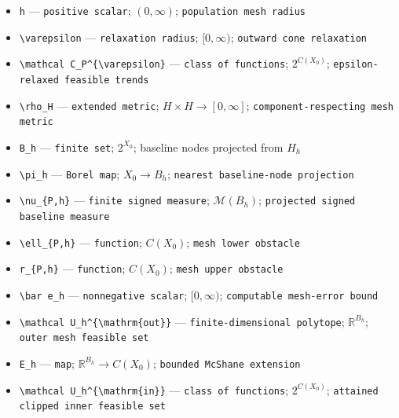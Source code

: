 \documentclass{article}
\begin{document}
\begin{itemize}
  \item \texttt{h} --- \texttt{positive scalar}; \((0,\infty)\); \texttt{population mesh radius}
  \item \texttt{\textbackslash{}\allowbreak{}varepsilon} --- \texttt{relaxation radius}; \([0,\infty)\); \texttt{outward cone relaxation}
  \item \texttt{\textbackslash{}\allowbreak{}mathcal C\_\allowbreak{}P\textasciicircum{}\{\textbackslash{}\allowbreak{}varepsilon\}\allowbreak{}} --- \texttt{class of functions}; \(2^{C(X_0)}\); \texttt{epsilon-\allowbreak{}relaxed feasible trends}
  \item \texttt{\textbackslash{}\allowbreak{}rho\_\allowbreak{}H} --- \texttt{extended metric}; \(H\times H\to[0,\infty]\); \texttt{component-\allowbreak{}respecting mesh metric}
  \item \texttt{B\_\allowbreak{}h} --- \texttt{finite set}; \(2^{X_0}\); baseline nodes projected from \(H_h\)
  \item \texttt{\textbackslash{}\allowbreak{}pi\_\allowbreak{}h} --- \texttt{Borel map}; \(X_0\to B_h\); \texttt{nearest baseline-\allowbreak{}node projection}
  \item \texttt{\textbackslash{}\allowbreak{}nu\_\allowbreak{}\{P,\allowbreak{}h\}\allowbreak{}} --- \texttt{finite signed measure}; \(\mathcal M(B_h)\); \texttt{projected signed baseline measure}
  \item \texttt{\textbackslash{}\allowbreak{}ell\_\allowbreak{}\{P,\allowbreak{}h\}\allowbreak{}} --- \texttt{function}; \(C(X_0)\); \texttt{mesh lower obstacle}
  \item \texttt{r\_\allowbreak{}\{P,\allowbreak{}h\}\allowbreak{}} --- \texttt{function}; \(C(X_0)\); \texttt{mesh upper obstacle}
  \item \texttt{\textbackslash{}\allowbreak{}bar e\_\allowbreak{}h} --- \texttt{nonnegative scalar}; \([0,\infty)\); \texttt{computable mesh-\allowbreak{}error bound}
  \item \texttt{\textbackslash{}\allowbreak{}mathcal U\_\allowbreak{}h\textasciicircum{}\{\textbackslash{}\allowbreak{}mathrm\{out\}\allowbreak{}\}\allowbreak{}} --- \texttt{finite-\allowbreak{}dimensional polytope}; \(\mathbb R^{B_h}\); \texttt{outer mesh feasible set}
  \item \texttt{E\_\allowbreak{}h} --- \texttt{map}; \(\mathbb R^{B_h}\to C(X_0)\); \texttt{bounded McShane extension}
  \item \texttt{\textbackslash{}\allowbreak{}mathcal U\_\allowbreak{}h\textasciicircum{}\{\textbackslash{}\allowbreak{}mathrm\{in\}\allowbreak{}\}\allowbreak{}} --- \texttt{class of functions}; \(2^{C(X_0)}\); \texttt{attained clipped inner feasible set}

\end{itemize}
\end{document}
